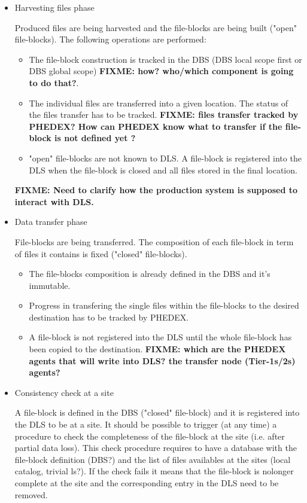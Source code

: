 \documentclass[pdftex]{cmspaper}
\begin{document}
%
\begin{itemize}

\item Harvesting files phase
 
 Produced files are being harvested and the file-blocks are being 
 built ("open" file-blocks). The following operations are performed:
 \begin{itemize}
  \item The file-block construction is tracked in the DBS (DBS local scope first 
 or DBS global scope) {\bf FIXME: how? who/which component is going to do that?}.
  \item The individual files are transferred into a given location. The status
        of the files transfer has to be tracked. {\bf FIXME: files transfer tracked by PHEDEX? How can PHEDEX know what to transfer if the file-block is not defined yet ?}
  \item "open" file-blocks are not known to DLS. A file-block is registered
        into the DLS when the file-block is closed and all files stored 
        in the final location.
 \end{itemize}

{\bf FIXME: Need to clarify how the production system is supposed to interact with DLS.}

\item Data transfer phase

 File-blocks are being transferred. The composition of each file-block 
 in term of files it contains is fixed ("closed" file-blocks).

 \begin{itemize}
  \item  The file-blocks composition is already defined in the DBS and 
         it's immutable.
  \item  Progress in transfering the single files within the file-blocks
         to the desired destination has to be tracked by PHEDEX.
  \item  A file-block is not registered into the DLS until the whole 
         file-block has been copied to the destination. {\bf FIXME: which are the PHEDEX agents that will write into DLS? the transfer node (Tier-1s/2s) agents?}
 \end{itemize}

\item Consistency check at a site

 A file-block is defined in the DBS ("closed" file-block) and it is 
 registered into the DLS to be at a site. 
 It should be possible to trigger (at any time) a procedure to check 
 the completeness of the file-block at the site (i.e. after partial data loss).
 This check procedure requires to have a database with the file-block 
 definition (DBS?) and the list of files availables at the sites (local catalog,
 trivial ls?).
 If the check fails it means that the file-block is nolonger complete at the site and the corresponding entry in the DLS need to be removed.

\end{itemize}
\end{document}
